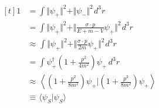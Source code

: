 \documentclass[12pt]{article}
\newcommand{\hs}{\hspace{1pt}} %
\begin{document}
\vline\hfill
\(\begin{aligned}[t]
    1 & = \int \Vert \psi_+ \Vert^2 + \Vert \psi_- \Vert^2 \hs d^3r\\
    & = \int \Vert \psi_+ \Vert^2 + \Vert \tfrac{\sigma \cdot p}{E+m-V} \psi_+ \Vert^2 \hs d^3r\\
    & \approx\hs \int \Vert \psi_+ \Vert^2 + \Vert \tfrac{\sigma \cdot p}{2m} \psi_+ \Vert^2 \hs d^3r\\
    & = \int \psi_+^\dagger ( 1 + \tfrac{p^2}{4m^2} ) \psi_+ \hs\hs d^3r\\
    & \approx\hs \left\langle ( 1 + \tfrac{p^2}{8m^2} ) \psi_+ \Big| ( 1 + \tfrac{p^2}{8m^2} ) \psi_+ \right\rangle \\
    & \equiv\hs \langle \psi_S | \psi_S \rangle
\end{aligned}\)
\end{document}
